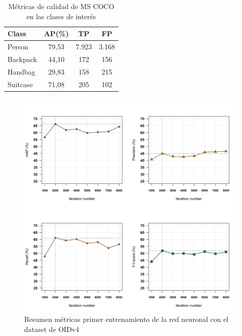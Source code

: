 \begin{table}[ht]
\centering
\caption{Métricas de calidad de MS COCO en las clases de interés}
\label{tab:metricas-clases-coco}
\begin{tabular}{lccc}
\hline
\textbf{Class} & \textbf{AP(\%)} & \textbf{TP} & \textbf{FP} \\ \hline
Person         & 79,53           & 7.923       & 3.168       \\
Backpack       & 44,10           & 172         & 156         \\
Handbag        & 29,83           & 158         & 215         \\
Suitcase       & 71,08           & 205         & 102         \\ \hline
\end{tabular}
\end{table}

\newpage

\begin{figure}[ht]
\centering
\includegraphics[width=1\textwidth]{img/chapters/resultados/metricas/metrics-train1.png}
\caption{\label{fig:metrics-train1}Resumen métricas primer entrenamiento de la red neuronal con el dataset de OIDv4}
\end{figure}

\newpage

